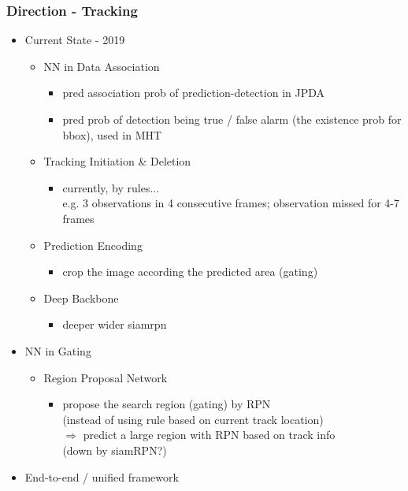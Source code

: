 \subsubsection{Direction - Tracking}
\begin{itemize}
\item Current State - 2019
	\begin{itemize}
	\item NN in Data Association
		\begin{itemize}
		\item pred association prob of prediction-detection in JPDA
		\item pred prob of detection being true / false alarm (the existence prob for bbox), used in MHT
		\end{itemize}
	\item Tracking Initiation \& Deletion
		\begin{itemize}
		\item currently, by rules... \\
		e.g. 3 observations in 4 consecutive frames; observation missed for 4-7 frames
		\end{itemize}
	\item Prediction Encoding
		\begin{itemize}
		\item crop the image according the predicted area (gating)
		\end{itemize}
	\item Deep Backbone
		\begin{itemize}
		\item deeper wider siamrpn
		\end{itemize}
	\end{itemize}
\item NN in Gating
	\begin{itemize}
	\item Region Proposal Network
		\begin{itemize}
		\item propose the search region (gating) by RPN \\ 
		(instead of using rule based on current track location) \\
		$\Rightarrow$ predict a large region with RPN based on track info \\
		(down by siamRPN?)
		\end{itemize}
	\end{itemize}
\item End-to-end / unified framework
	\begin{itemize}

\end{itemize}
\end{itemize}
